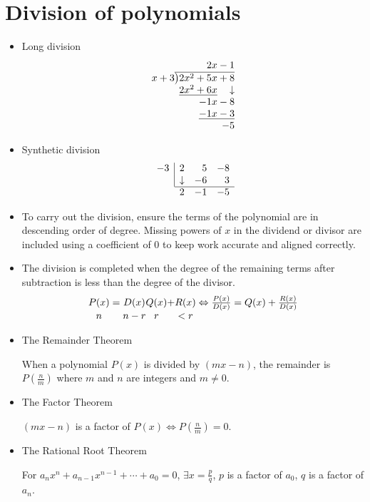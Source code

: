 \section{Division of polynomials}
\begin{itemize}
    \item Long division
        \[
            \begin{array}{r}
                \phantom{2x^2+}2x-1 \\
                x+3\overline{\smash{\big)}2x^2+5x+8} \\
                \underline{2x^2+6x}\phantom{{}+\,}\downarrow \\
                -1x-8 \\
                \underline{-1x-3} \\
                -5
            \end{array}
        \]
    \item Synthetic division
        \[
            \begin{array}{rrrr}
                \multicolumn{1}{r|}{-3} & 2 & 5 & -8 \\
                \multicolumn{1}{r|}{} & \downarrow & -6 & 3 \\ \cline{2-4}
                & 2 & -1 & -5
            \end{array}
        \]
    \item To carry out the division, ensure the terms of the polynomial are in descending order of degree. Missing powers of $x$ in the dividend or divisor are included using a coefficient of 0 to keep work accurate and aligned correctly.
    \item The division is completed when the degree of the remaining terms after subtraction is less than the degree of the divisor.
        \[
            \begin{array}{c@{}c@{}c@{}c@{}c@{}c@{}c}
            P(x) & {}={} & D(x) & Q(x) & + & R(x) & {}\Leftrightarrow \frac{P(x)}{D(x)}=Q(x)+\frac{R(x)}{D(x)} \\
            n & & n-r & r & & <r &
            \end{array}
        \]
    \item The Remainder Theorem

        When a polynomial $P(x)$ is divided by $(mx-n)$, the remainder is $P(\frac{n}{m})$ where $m$ and $n$ are integers and $m\neq 0$.
    \item The Factor Theorem
        
        $(mx-n)$ is a factor of $P(x)\iff P(\frac{n}{m})=0$.
    \item The Rational Root Theorem

        For $a_nx^n+a_{n-1}x^{n-1}+\cdots+a_0=0$, $\exists x=\frac{p}{q}$, $p$ is a factor of $a_0$, $q$ is a factor of $a_n$.
\end{itemize}

